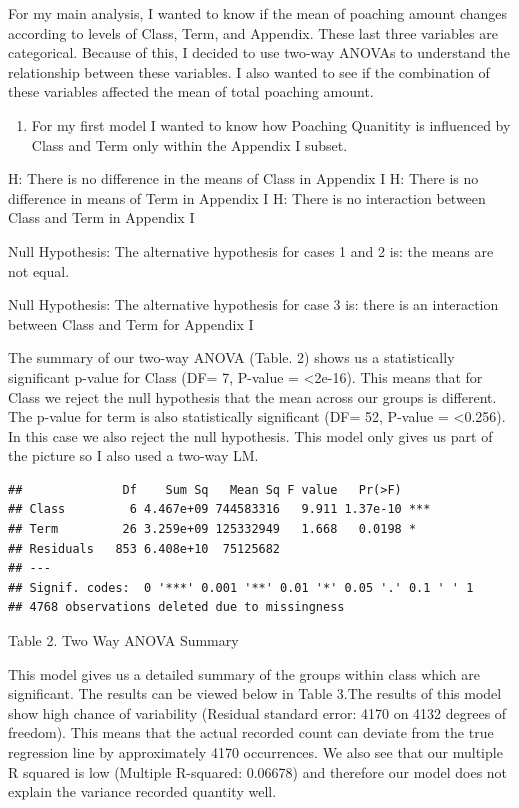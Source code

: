\documentclass[
  12pt,
]{article}
\providecommand{\tightlist}{%
  \setlength{\itemsep}{0pt}\setlength{\parskip}{0pt}}
\begin{document}
For my main analysis, I wanted to know if the mean of poaching amount
changes according to levels of Class, Term, and Appendix. These last
three variables are categorical. Because of this, I decided to use
two-way ANOVAs to understand the relationship between these variables. I
also wanted to see if the combination of these variables affected the
mean of total poaching amount.

\begin{enumerate}
\def\labelenumi{\arabic{enumi}.}
\tightlist
\item
  For my first model I wanted to know how Poaching Quanitity is
  influenced by Class and Term only within the Appendix I subset.
\end{enumerate}

H: There is no difference in the means of Class in Appendix I H: There
is no difference in means of Term in Appendix I H: There is no
interaction between Class and Term in Appendix I

Null Hypothesis: The alternative hypothesis for cases 1 and 2 is: the
means are not equal.

Null Hypothesis: The alternative hypothesis for case 3 is: there is an
interaction between Class and Term for Appendix I

The summary of our two-way ANOVA (Table. 2) shows us a statistically
significant p-value for Class (DF= 7, P-value = \textless2e-16). This
means that for Class we reject the null hypothesis that the mean across
our groups is different. The p-value for term is also statistically
significant (DF= 52, P-value = \textless0.256). In this case we also
reject the null hypothesis. This model only gives us part of the picture
so I also used a two-way LM.

\begin{verbatim}
##              Df    Sum Sq   Mean Sq F value   Pr(>F)    
## Class         6 4.467e+09 744583316   9.911 1.37e-10 ***
## Term         26 3.259e+09 125332949   1.668   0.0198 *  
## Residuals   853 6.408e+10  75125682                     
## ---
## Signif. codes:  0 '***' 0.001 '**' 0.01 '*' 0.05 '.' 0.1 ' ' 1
## 4768 observations deleted due to missingness
\end{verbatim}

Table 2. Two Way ANOVA Summary

This model gives us a detailed summary of the groups within class which
are significant. The results can be viewed below in Table 3.The results
of this model show high chance of variability (Residual standard error:
4170 on 4132 degrees of freedom). This means that the actual recorded
count can deviate from the true regression line by approximately 4170
occurrences. We also see that our multiple R squared is low (Multiple
R-squared: 0.06678) and therefore our model does not explain the
variance recorded quantity well.
\end{document}
